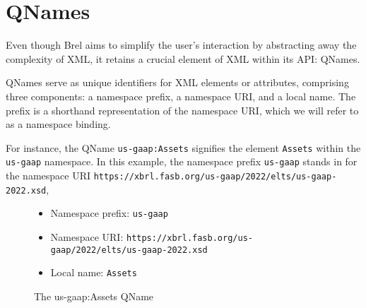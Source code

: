 \section{QNames}
\label{sec:qnames}





Even though Brel aims to simplify the user's interaction by abstracting away the complexity of XML,
it retains a crucial element of XML within its API: QNames.

QNames serve as unique identifiers for XML elements or attributes,
comprising three components: a namespace prefix, a namespace URI, and a local name.
The prefix is a shorthand representation of the namespace URI, which we will refer to as a namespace binding.

For instance, the QName \texttt{us-gaap:Assets} signifies the element \texttt{Assets} within the \texttt{us-gaap} namespace.
In this example, the namespace prefix \texttt{us-gaap} stands in for the namespace URI \texttt{https://xbrl.fasb.org/us-gaap/2022/elts/us-gaap-2022.xsd},

\begin{figure}[H]
    \caption{The us-gaap:Assets QName}
    \label{fig:qname_us_gaap_assets}
    \begin{itemize}
        \item Namespace prefix: \texttt{us-gaap}
        \item Namespace URI: \texttt{https://xbrl.fasb.org/us-gaap/2022/elts/us-gaap-2022.xsd}
        \item Local name: \texttt{Assets}
    \end{itemize}
\end{figure}

